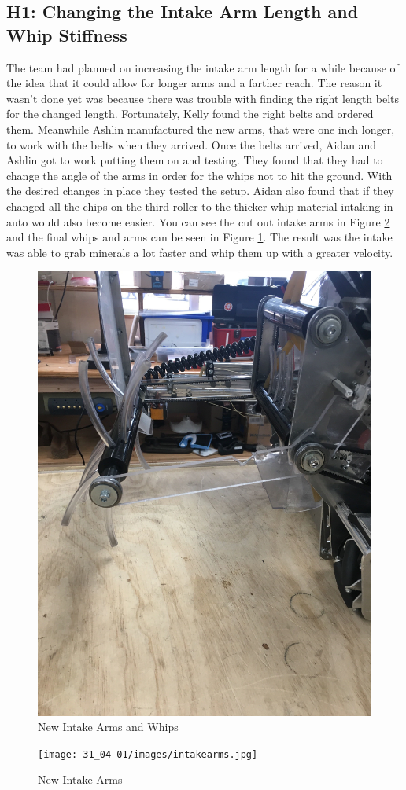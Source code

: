 \documentclass{article}
\begin{document}
\subsection{H1: Changing the Intake Arm Length and Whip Stiffness}

The team had planned on increasing the intake arm length for a while because of the idea that it could allow for longer arms and a farther reach. The reason it wasn't done yet was because there was trouble with finding the right length belts for the changed length. Fortunately, Kelly found the right belts and ordered them. Meanwhile Ashlin manufactured the new arms, that were one inch longer, to work with the belts when they arrived. Once the belts arrived, Aidan and Ashlin got to work putting them on and testing. They found that they had to change the angle of the arms in order for the whips not to hit the ground. With the desired changes in place they tested the setup. Aidan also found that if they changed all the chips on the third roller to the thicker whip material intaking in auto would also become easier. You can see the cut out intake arms in Figure \ref{fig:intakearms} and the final whips and arms can be seen in Figure \ref{fig:arms}. The result was the intake was able to grab minerals a lot faster and whip them up with a greater velocity.

\begin{figure}
    \centering
    \includegraphics[width= 0.5 \textwidth]{31_04-01/images/IMG_1934.JPG}
    \caption{New Intake Arms and Whips}
    \label{fig:arms}
\end{figure}

\begin{figure}
    \centering
    \texttt{[image: 31\_04-01/images/intakearms.jpg]}
    \caption{New Intake Arms}
    \label{fig:intakearms}
\end{figure}
\end{document}
